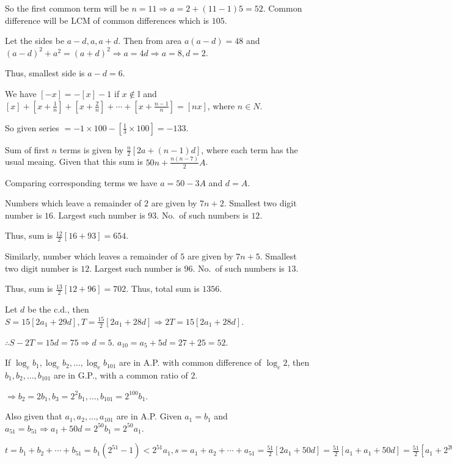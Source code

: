   So the first common term will be $n = 11\Rightarrow a = 2 + (11 - 1)5 = 52$. Common difference will be LCM
  of common differences which is $105$.
\item Let the sides be $a - d, a, a + d$. Then from area $a(a - d) = 48$ and $(a - d)^2 + a^2 = (a +
  d)^2\Rightarrow a = 4d \Rightarrow a = 8, d = 2$.

  Thus, smallest side is $a - d = 6$.
\item We have $[-x] = -[x] - 1$ if $x\not\in\mathbb{I}$ and $[x] + \left[x + \frac{1}{n}\right] + \left[x
  + \frac{2}{n}\right] + \cdots + \left[x + \frac{n - 1}{n}\right] = [nx]$, where $n\in{N}$.

  So given series $= -1\times 100 - \left[\frac{1}{3}\times 100\right] = -133$.
\item Sum of first $n$ terms is given by $\frac{n}{2}[2a + (n - 1)d]$, where each term has the usual
  meaing. Given that this sum is $50n + \frac{n(n - 7)}{2}A$.

  Comparing corresponding terms we have $a = 50 - 3A$ and $d = A$.
\item Numbers which leave a remainder of $2$ are given by $7n + 2$. Smallest two digit number is
  $16$. Largest such number is $93$. No.\ of such numbers is $12$.

  Thus, sum is $\frac{12}{2}[16 + 93] = 654$.

  Similarly, number which leaves a remainder of $5$ are given by $7n + 5$. Smallest two digit number is
  $12$. Largest such number is $96$. No.\ of such numbers is $13$.

  Thus, sum is $\frac{13}{2}[12 + 96] = 702$. Thus, total sum is $1356$.
\item Let $d$ be the c.d., then $S = 15[2a_1 + 29d], T = \frac{15}{2}[2a_1 + 28d] \Rightarrow 2T = 15[2a_1 +
  28d]$.

  $\therefore S - 2T = 15d = 75 \Rightarrow d = 5$. $a_{10} = a_5 + 5d = 27 + 25 = 52$.
\item If $\log_eb_1, \log_eb_2, \ldots, \log_eb_{101}$ are in A.P. with common difference of $\log_e2$, then
  $b_1, b_2, \ldots, b_{101}$ are in G.P., with a common ratio of $2$.

  $\Rightarrow b_2 = 2b_1, b_3 = 2^2b_1, \ldots, b_{101} = 2^{100}b_1$.

  Also given that $a_1, a_2, \ldots, a_{101}$ are in A.P. Given $a_1 = b_1$ and $a_{51} = b_{51}\Rightarrow
  a_1 + 50d = 2^{50}b_1 = 2^{50}a_1$.

  $t = b_1 + b_2 + \cdots + b_{51} = b_1(2^{51} - 1) < 2^{51}a_1, s = a_1 + a_2 + \cdots + a_{51}
  = \frac{51}{2}[2a_1 + 50d] = \frac{51}{2}[a_1 + a_1 + 50d] = \frac{51}{2}[a_1 + 2^{20}a_1] > 2^{51}a_1$

